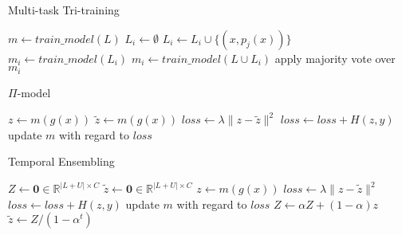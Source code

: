 \documentclass{article}
\begin{document}
\begin{algorithm}[t!]
\caption{Multi-task Tri-training}
\begin{algorithmic}[1]
\State $m \gets train\_model(L)$
\Repeat
        \State $L_i \gets \emptyset$
            	\State $L_i \gets L_i \cup \{(x, p_j(x))\}$
            \EndIf
        \EndFor
        		\State $m_i \gets train\_model(L_i)$
        \Else
        		\State $m_i \gets train\_model(L \cup L_i)$
        \EndIf
	\EndFor
{}
\State apply majority vote over $m_i$
\end{algorithmic}
\end{algorithm}

\begin{algorithm}[t!]
\caption{$\Pi$-model}
\begin{algorithmic}[1]
\Repeat
		\State $z \gets m(g(x))$
		\State $\tilde{z} \gets m(g(x))$
		\State $loss \gets \lambda \| z - \tilde{z} \|^2$ 
			\State $loss \gets loss + H(z, y) $ 
		\EndIf
		\State update $m$ with regard to $loss$
	\EndFor
{}
\end{algorithmic}
\end{algorithm}

\begin{algorithm}[t!]
\caption{Temporal Ensembling}
\begin{algorithmic}[1]
\Repeat
	\State $Z \gets \mathbf{0} \in \mathbb{R}^{|L+U| \times C}$
	\State $\tilde{z} \gets \mathbf{0} \in \mathbb{R}^{|L+U| \times C}$
		\State $z \gets m(g(x))$
		\State $loss \gets \lambda \| z - \tilde{z} \|^2$ 
			\State $loss \gets loss + H(z, y) $ 
		\EndIf
		\State update $m$ with regard to $loss$
	\EndFor
	\State $Z \gets \alpha Z + (1-\alpha)z$
	\State $\tilde{z} \gets Z/(1- \alpha^t)$
\end{algorithmic}
\end{algorithm}
\end{document}

